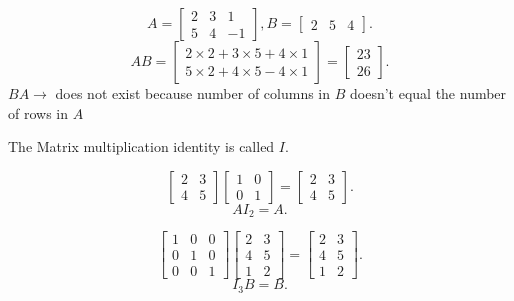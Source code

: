 \documentclass{article}
\begin{document}
\newpage

\begin{example}
    \[
        A=
        \begin{bmatrix} 2&3&1\\5&4&-1 \end{bmatrix},
        B=
        \begin{bmatrix} 2&5&4 \end{bmatrix} 
    .\] 
    \[
        AB = 
        \begin{bmatrix} 
            2\times 2+3\times 5+4\times 1\\
            5\times 2+4\times 5-4\times 1
        \end{bmatrix} 
        =
        \begin{bmatrix} 23\\26 \end{bmatrix} 
    .\] 
    $BA \longrightarrow$ does not exist because number of columns in $B$ doesn't equal the number of rows in $A$
\end{example}
\hspace{1em}

The Matrix multiplication identity is called $I$.

\begin{example}
    \[
        \begin{bmatrix} 2&3\\4&5 \end{bmatrix} 
        \begin{bmatrix} 1&0\\0&1 \end{bmatrix} 
        =
        \begin{bmatrix} 2&3\\4&5 \end{bmatrix} 
    .\] 
    \[ AI_2=A .\] 
\end{example}

\begin{example}
    \[
        \begin{bmatrix} 1&0&0\\0&1&0\\0&0&1 \end{bmatrix} 
        \begin{bmatrix} 2&3\\4&5\\1&2 \end{bmatrix} 
        =
        \begin{bmatrix} 2&3\\4&5\\1&2 \end{bmatrix} 
    .\] 
    \[ I_3B=B .\] 
\end{example}
\end{document}
